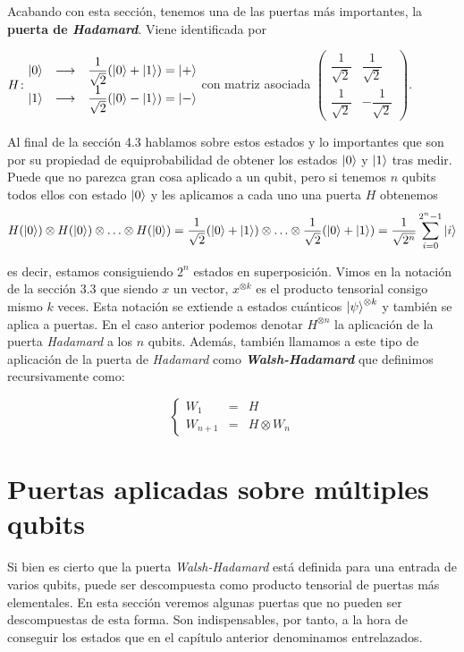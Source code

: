 Acabando con esta sección, tenemos una de las puertas más importantes, la \textbf{puerta de \textit{Hadamard}}. Viene identificada por

$H\colon \begin{matrix}\left|0\right\rangle&\longrightarrow& \dfrac{1}{\sqrt{2}}(\left|0\right\rangle+\left|1\right\rangle)=\left|+\right\rangle\\ \left|1\right\rangle&\longrightarrow& \dfrac{1}{\sqrt{2}}(\left|0\right\rangle-\left|1\right\rangle)=\left|-\right\rangle\end{matrix}$ con matriz asociada $\left(\begin{matrix}\dfrac{1}{\sqrt{2}}&\dfrac{1}{\sqrt{2}}\\ \dfrac{1}{\sqrt{2}}&-\dfrac{1}{\sqrt{2}}\end{matrix}\right)$.

Al final de la sección 4.3 hablamos sobre estos estados y lo importantes que son por su propiedad de equiprobabilidad de obtener los estados $\left|0\right\rangle$ y $\left|1\right\rangle$ tras medir. Puede que no parezca gran cosa aplicado a un qubit, pero si tenemos $n$ qubits todos ellos con estado $\left|0\right\rangle$ y les aplicamos a cada uno una puerta $H$ obtenemos
\begin{equation}
H(\left|0\right\rangle)\otimes H(\left|0\right\rangle)\otimes\hdots\otimes H(\left|0\right\rangle)=\dfrac{1}{\sqrt{2}}(\left|0\right\rangle+\left|1\right\rangle)\otimes\hdots\otimes\dfrac{1}{\sqrt{2}}(\left|0\right\rangle+\left|1\right\rangle)=\dfrac{1}{\sqrt{2^n}}\sum_{i=0}^{2^n-1}\left|i\right\rangle
\end{equation}

es decir, estamos consiguiendo $2^n$ estados en superposición. Vimos en la notación de la sección 3.3 que siendo $x$ un vector, $x^{\otimes k}$ es el producto tensorial consigo mismo $k$ veces. Esta notación se extiende a estados cuánticos $\left|\psi\right\rangle^{\otimes k}$ y también se aplica a puertas. En el caso anterior podemos denotar $H^{\otimes n}$ la aplicación de la puerta \textit{Hadamard} a los $n$ qubits. Además, también llamamos a este tipo de aplicación de la puerta de \textit{Hadamard} como \textit{\textbf{Walsh-Hadamard}} que definimos recursivamente como:

\begin{equation}
\left\{\begin{matrix}W_1&=&H\\W_{n+1}&=&H\otimes W_n\end{matrix}\right.
\end{equation}

\section{Puertas aplicadas sobre múltiples qubits}

Si bien es cierto que la puerta \textit{Walsh-Hadamard} está definida para una entrada de varios qubits, puede ser descompuesta como producto tensorial de puertas más elementales. En esta sección veremos algunas puertas que no pueden ser descompuestas de esta forma. Son indispensables, por tanto, a la hora de conseguir los estados que en el capítulo anterior denominamos entrelazados.

